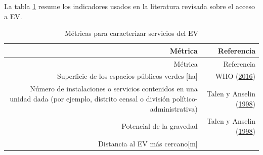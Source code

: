 \documentclass[12pt,a4paper,oneside, openany]{book}
\theoremstyle{definition}
\theoremstyle{definition}
\theoremstyle{definition}
\theoremstyle{remark}
\begin{document}
La tabla \ref{tab:ind-EV} resume los indicadores usados en la literatura
revisada sobre el acceso a EV.

\begin{longtable}[]{@{}rr@{}}
\caption{\label{tab:ind-EV} Métricas para caracterizar servicios del
EV}\tabularnewline
\toprule
\begin{minipage}[b]{0.57\columnwidth}\raggedleft\strut
Métrica\strut
\end{minipage} & \begin{minipage}[b]{0.31\columnwidth}\raggedleft\strut
Referencia\strut
\end{minipage}\tabularnewline
\midrule
\endfirsthead
\toprule
\begin{minipage}[b]{0.57\columnwidth}\raggedleft\strut
Métrica\strut
\end{minipage} & \begin{minipage}[b]{0.31\columnwidth}\raggedleft\strut
Referencia\strut
\end{minipage}\tabularnewline
\midrule
\endhead
\begin{minipage}[t]{0.57\columnwidth}\raggedleft\strut
Superficie de los espacios públicos verdes {[}ha{]}\strut
\end{minipage} & \begin{minipage}[t]{0.31\columnwidth}\raggedleft\strut
WHO (\protect\hyperlink{ref-who2016urban}{2016})\strut
\end{minipage}\tabularnewline
\begin{minipage}[t]{0.57\columnwidth}\raggedleft\strut
Número de instalaciones o servicios contenidos en una unidad dada (por
ejemplo, distrito censal o división político-administrativa)\strut
\end{minipage} & \begin{minipage}[t]{0.31\columnwidth}\raggedleft\strut
Talen y Anselin
(\protect\hyperlink{ref-talen_assessing_1998}{1998})\strut
\end{minipage}\tabularnewline
\begin{minipage}[t]{0.57\columnwidth}\raggedleft\strut
Potencial de la gravedad\strut
\end{minipage} & \begin{minipage}[t]{0.31\columnwidth}\raggedleft\strut
Talen y Anselin
(\protect\hyperlink{ref-talen_assessing_1998}{1998})\strut
\end{minipage}\tabularnewline
\begin{minipage}[t]{0.57\columnwidth}\raggedleft\strut
Distancia al EV más cercano{[}m{]}\strut
\end{minipage} & \begin{minipage}[t]{0.31\columnwidth}\raggedleft\strut

\end{minipage}
\end{longtable}
\end{document}
